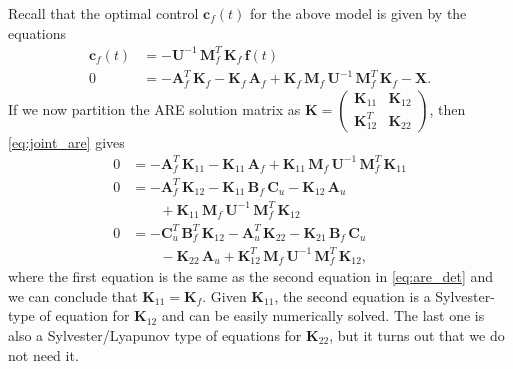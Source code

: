 \documentclass[journal]{IEEEtran}
\begin{document}
Recall that the optimal control $\mathbf{c}_f(t)$ for the above model is given by the equations
%
\begin{equation}
\begin{split}
  \mathbf{c}_f(t) &=
  - \mathbf{U}^{-1} \, \mathbf{M}_f^T \, \mathbf{K}_f \, \mathbf{f}(t) \\
  0 &=
    -\mathbf{A}_f^T \, \mathbf{K}_f - \mathbf{K}_f \, \mathbf{A}_f
  +  \mathbf{K}_f \, \mathbf{M}_f \, \mathbf{U}^{-1} \,
   \mathbf{M}_f^T \, \mathbf{K}_f - \mathbf{X}.
\end{split}
\label{eq:are_det}
\end{equation}
%
If we now partition the ARE solution matrix as $\mathbf{K} = \begin{pmatrix} \mathbf{K}_{11} & \mathbf{K}_{12} \\ \mathbf{K}_{12}^T & \mathbf{K}_{22} \end{pmatrix}$, then \eqref{eq:joint_are} gives
%
\begin{equation}
\begin{split}
  0
  &= -\mathbf{A}_f^T \, \mathbf{K}_{11} - \mathbf{K}_{11} \, \mathbf{A}_f
  + \mathbf{K}_{11} \, \mathbf{M}_f \, \mathbf{U}^{-1} \, \mathbf{M}_f^T \, \mathbf{K}_{11} \\
  0
  &= -\mathbf{A}_f^T \, \mathbf{K}_{12} - \mathbf{K}_{11} \, \mathbf{B}_f \, \mathbf{C}_u - \mathbf{K}_{12} \, \mathbf{A}_u
  \\
  &\qquad + \mathbf{K}_{11} \, \mathbf{M}_f \, \mathbf{U}^{-1} \, \mathbf{M}_f^T \, \mathbf{K}_{12} \\
  0
  &= -\mathbf{C}_u^T \, \mathbf{B}_f^T \, \mathbf{K}_{12} - \mathbf{A}_u^T \, \mathbf{K}_{22}
  - \mathbf{K}_{21} \, \mathbf{B}_f \, \mathbf{C}_u \\
  &\qquad  - \mathbf{K}_{22} \, \mathbf{A}_u
  + \mathbf{K}_{12}^T \, \mathbf{M}_f \, \mathbf{U}^{-1} \, \mathbf{M}_f^T \, \mathbf{K}_{12},
\end{split}
\end{equation}
%
where the first equation is the same as the second equation in \eqref{eq:are_det} and we can conclude that $\mathbf{K}_{11} = \mathbf{K}_f$. Given $\mathbf{K}_{11}$, the second equation is a Sylvester-type of equation for $\mathbf{K}_{12}$ and can be easily numerically solved. The last one is also a Sylvester/Lyapunov type of equations for $\mathbf{K}_{22}$, but it turns out that we do not need it.
\end{document}
